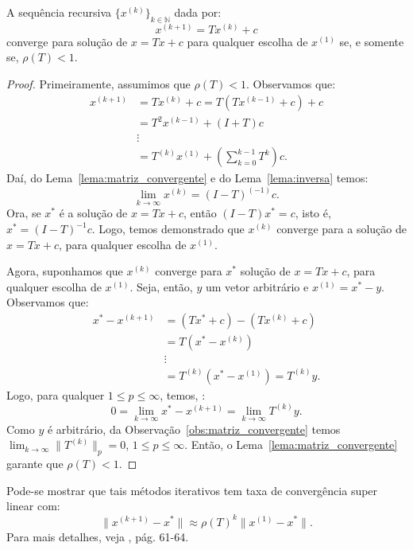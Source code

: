 \begin{teo}\label{teo:convergencia}
  A sequência recursiva $\{x^{(k)}\}_{k\in\mathbb{N}}$ dada por:
  \begin{equation}
    x^{(k+1)} = Tx^{(k)} + c
  \end{equation}
converge para solução de $x = Tx + c$ para qualquer escolha de $x^{(1)}$ se, e somente se, $\rho(T) < 1$.
\end{teo}
\begin{proof}
  Primeiramente, assumimos que $\rho(T) < 1$. Observamos que:
  \begin{eqnarray}
    x^{(k+1)} &= Tx^{(k)} + c = T(Tx^{(k-1)} + c) + c \\
    &= T^2x^{(k-1)} + (I + T)c \\
    &\vdots\\
    &= T^{(k)}x^{(1)} + \left(\sum_{k=0}^{k-1}T^k\right)c.
  \end{eqnarray}
Daí, do Lema~\ref{lema:matriz_convergente} e do Lema~\ref{lema:inversa} temos:
\begin{equation}
  \lim_{k\to\infty} x^{(k)} = (I - T)^{(-1)}c.
\end{equation}
Ora, se $x^*$ é a solução de $x = Tx + c$, então $(I - T)x^* = c$, isto é, $x^* = (I - T)^{-1}c$. Logo, temos demonstrado que $x^{(k)}$ converge para a solução de  $x = Tx + c$, para qualquer escolha de $x^{(1)}$.

Agora, suponhamos que $x^{(k)}$ converge para $x^*$ solução de $x = Tx + c$, para qualquer escolha de $x^{(1)}$. Seja, então, $y$ um vetor arbitrário e $x^{(1)} = x^* - y$. Observamos que:
\begin{eqnarray}
  x^* - x^{(k+1)} &= (Tx^* + c) - (Tx^{(k)} + c) \\
  &= T(x^* - x^{(k)})\\
  &\vdots\\
  &= T^{(k)}(x^* - x^{(1)}) = T^{(k)}y.
\end{eqnarray}
Logo, para qualquer $1 \leq p \leq\infty$, temos, :
\begin{equation}
  0 = \lim_{k\to\infty} x^* - x^{(k+1)} = \lim_{k\to\infty} T^{(k)}y.
\end{equation}
Como $y$ é arbitrário, da Observação~\ref{obs:matriz_convergente} temos $\displaystyle\lim_{k\to\infty} \|T^{(k)}\|_p = 0$, $1 \leq p \leq \infty$. Então, o Lema~\ref{lema:matriz_convergente} garante que $\rho(T) < 1$.
\end{proof}

\begin{obs}
  Pode-se mostrar que tais métodos iterativos tem taxa de convergência super linear com:
  \begin{equation}
    \|x^{(k+1)} - x^*\| \approx \rho(T)^{k}\|x^{(1)} - x^*\|.
  \end{equation}
Para mais detalhes, veja \cite{Isaacson1994a}, pág. 61-64.
\end{obs}

